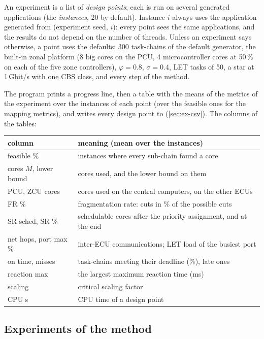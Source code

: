 An experiment is a list of \emph{design points}; each is run on several
generated applications (the \emph{instances}, 20 by default). Instance
$i$ always uses the application generated from (experiment seed, $i$):
every point sees the same applications, and the results do not depend on
the number of threads. Unless an experiment says otherwise, a point uses
the defaults: 300 task-chains of the default generator, the built-in
zonal platform (8 big cores on the PCU, 4 microcontroller cores at 50\,\%
on each of the five zone controllers), $\varphi = 0.8$, $\sigma = 0.4$,
LET tasks of 50\us, a star at 1\,Gbit/s with one CBS class, and every
step of the method.

The program prints a progress line, then a table with the means of the
metrics of the experiment over the instances of each point (over the
feasible ones for the mapping metrics), and writes every design point to
 (\cref{sec:ex-csv}). The columns of the tables:

\begin{center}\small\row
\begin{tabularx}{\textwidth}{@{}>{\raggedright\arraybackslash}p{36mm}X@{}}
\toprule\rowcolor{white}
column & meaning (mean over the instances) \\
\midrule
feasible \% & instances where every sub-chain found a core \\
cores $M$, lower bound & cores used, and the lower bound on them \\
PCU, ZCU cores & cores used on the central computers, on the other ECUs \\
FR \% & fragmentation rate: cuts in \% of the possible cuts \\
SR sched, SR \% & schedulable cores after the priority assignment, and at the end \\
net hops, port max \% & inter-ECU communications; LET load of the busiest port \\
on time, misses & task-chains meeting their deadline (\%), late ones \\
reaction max & the largest maximum reaction time (ms) \\
scaling & critical scaling factor \\
CPU s & CPU time of a design point \\
\bottomrule
\end{tabularx}
\end{center}

\subsection{Experiments of the method}

